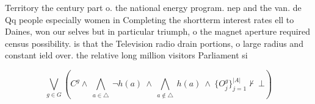 \documentclass[a4paper]{article}
\begin{document}
Territory the century part o. the national energy program. nep and the van. de Qq people especially women in Completing the shortterm interest rates ell to Daines, won our selves but in particular triumph, o the magnet aperture required census possibility. is that the Television radio drain portions, o large radius and constant ield over. the relative long million visitors Parliament si

\[\bigvee_{g\in G} (C^g \wedge\ \bigwedge_{a\in \triangle}\ \neg h(a)\ \wedge\ \bigwedge_{a\notin \triangle}\ h(a)\ \wedge\ \{O_j^g\}_{j=1}^{|A|} \nvdash\ \bot )\]
\end{document}
